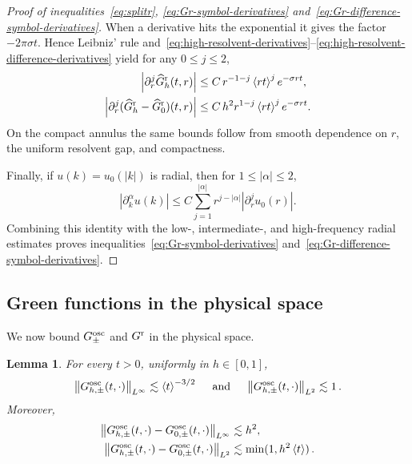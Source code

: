 \documentclass[a4paper,12pt]{amsart} %
\theoremstyle{plain}
\newtheorem{lem}[thm]{Lemma}
\theoremstyle{definition}
\newcommand		{\lt}			{\left}				%
\newcommand		{\rt}			{\right}			%
\renewcommand	{\(}			{\lt(}
\renewcommand	{\)}			{\rt)}
\newcommand		{\bangle}[1]	{\lt\langle #1\rt\rangle}
\newcommand		{\weight}[1]	{\bangle{#1}}	%
\newcommand		{\n}[1]			{\lt\lvert{#1}\rt\rvert}	%
\newcommand		{\nrm}[1]		{\lt\lVert{#1}\rt\rVert}		%
\newcommand		{\Nrm}[2]		{\nrm{#1}_{#2}}
\newcommand	{\h}			{h}
\newcommand		{\Gr}			{G^{\textnormal{r}}}
\newcommand		{\Gosc}			{G^{\textnormal{osc}}}
\newcommand		{\hatG}			{\widehat{G}}
\newcommand		{\hatGr}		{\hatG^{\textnormal{r}}}
\begin{document}
\begin{proof}[Proof of inequalities~\eqref{eq:splitr}, \eqref{eq:Gr-symbol-derivatives} and~\eqref{eq:Gr-difference-symbol-derivatives}]
		When a derivative hits the exponential it gives the factor $-2\pi\sigma t$. Hence Leibniz' rule and~\eqref{eq:high-resolvent-derivatives}--\eqref{eq:high-resolvent-difference-derivatives} yield for any $0\leq j\leq2$,
		\begin{align*}
			\n{\partial_r^j\hatGr_\h(t,r)}
			&\leq C\, r^{-1-j}\weight{rt}^{j}e^{-\sigma rt},
			\\
			\n{\partial_r^j(\hatGr_\h-\hatGr_0)(t,r)}
			&\leq C \, h^2r^{1-j}\weight{rt}^{j}e^{-\sigma rt} .
		\end{align*}
		On the compact annulus the same bounds follow from smooth dependence on $r$, the uniform resolvent gap, and compactness.

		Finally, if $u(k) = u_0(\n{k})$ is radial, then for $1\leq\n{\alpha}\leq2$,
		\begin{equation*}
			\n{\partial_k^\alpha u(k)}
			\leq C\sum_{j=1}^{\n{\alpha}}
			r^{j-\n{\alpha}}\n{\partial_r^j u_0(r)} .
		\end{equation*}
		Combining this identity with the low-, intermediate-, and high-frequency radial estimates proves inequalities~\eqref{eq:Gr-symbol-derivatives} and~\eqref{eq:Gr-difference-symbol-derivatives}.
	\end{proof}




\subsection{Green functions in the physical space \label{physicalspace}}



	We now bound $\Gosc_\pm$ and $\Gr$ in the physical space.
	
	\begin{lem}\label{lem:decay_Gosc}
		For every $t>0$, uniformly in $\h\in[0,1]$,
		\begin{equation} \label{eq:decayGosc1}
			\Nrm{\Gosc_{\h,\pm}(t,\cdot)}{L^\infty} \lesssim \weight{t}^{-3/2} \quad \text{ and } \quad \Nrm{\Gosc_{\h,\pm}(t,\cdot)}{L^2} \lesssim 1 \, .
		\end{equation}
		Moreover,
		\begin{align}\notag
			\Nrm{\Gosc_{\h,\pm}(t,\cdot)-\Gosc_{0,\pm}(t,\cdot)}{L^\infty}
			&\lesssim h^2,
			\\\label{eq:decayGosc2}
			\Nrm{\Gosc_{\h,\pm}(t,\cdot)-\Gosc_{0,\pm}(t,\cdot)}{L^2}
			&\lesssim \min(1,h^2\weight{t}) \, .
		\end{align}
	\end{lem}
\end{document}
